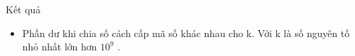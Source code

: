Kết quả  
\begin{itemize}
	\item     Phần dư khi chia số cách cấp mã số khác nhau cho k. Với k là số nguyên tố nhỏ nhất lớn hơn $10^{9}$    .   
\end{itemize}